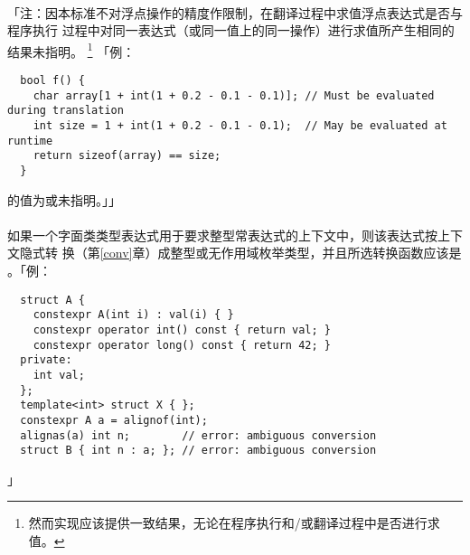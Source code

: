 \paragraph{}
「注：因本标准不对浮点操作的精度作限制，在翻译过程中求值浮点表达式是否与程序执行
过程中对同一表达式（或同一值上的同一操作）进行求值所产生相同的结果未指明。
\footnote{然而实现应该提供一致结果，无论在程序执行和/或翻译过程中是否进行求值。}
「例：
\begin{lstlisting}
  bool f() {
    char array[1 + int(1 + 0.2 - 0.1 - 0.1)]; // Must be evaluated during translation
    int size = 1 + int(1 + 0.2 - 0.1 - 0.1);  // May be evaluated at runtime
    return sizeof(array) == size;
  }
\end{lstlisting}
的值为或未指明。」」

\paragraph{}
如果一个字面类类型表达式用于要求整型常表达式的上下文中，则该表达式按上下文隐式转
换（第\ref{conv}章）成整型或无作用域枚举类型，并且所选转换函数应该是
。「例：
\begin{lstlisting}
  struct A {
    constexpr A(int i) : val(i) { }
    constexpr operator int() const { return val; }
    constexpr operator long() const { return 42; }
  private:
    int val;
  };
  template<int> struct X { };
  constexpr A a = alignof(int);
  alignas(a) int n;        // error: ambiguous conversion
  struct B { int n : a; }; // error: ambiguous conversion
\end{lstlisting}」
